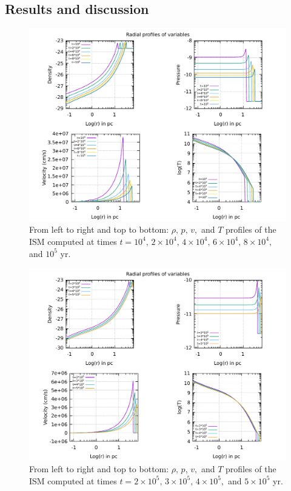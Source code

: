 \documentclass{article}
\begin{document}
\subsection{Results and discussion}

\begin{figure}[H]
	\centering
	\includegraphics[width=0.8 \linewidth]{radialprofiles.pdf}
	\caption{From left to right and top to bottom: $\rho,\,p,\,v,$ and $T$ profiles of the ISM computed at times $t=10^4,\,2\times10^4,\,4\times10^4,\,6\times10^4,\,8\times 10^4,$ and $10^5$ yr.}

	\label{fig:radialpr}
\end{figure}
\begin{figure}[H]
	\centering
	\includegraphics[width=0.8 \linewidth]{radialprofileshight.pdf}
	\caption{From left to right and top to bottom: $\rho,\,p,\,v,$ and $T$ profiles of the ISM computed at times $t=2\times10^5,\,3\times10^5,\,4\times10^5,$ and $5\times10^5$ yr.}

	\label{fig:radialprhight}
\end{figure}
\end{document}
